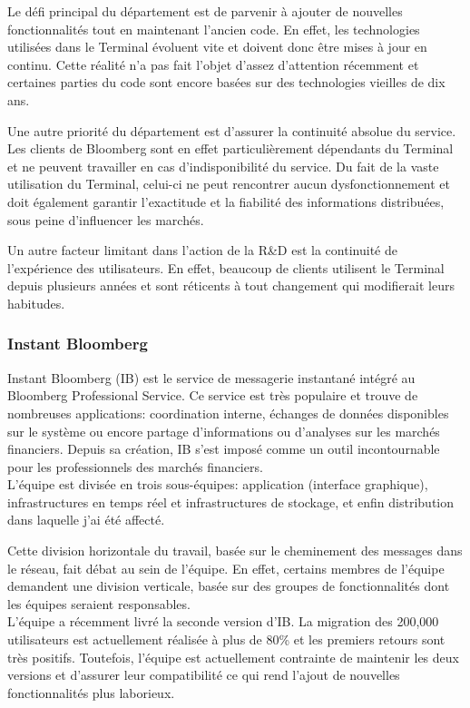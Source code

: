 \documentclass[11pt, oneside, titlepage, a4paper]{article}
\begin{document}
Le défi principal du département est de parvenir à ajouter de nouvelles fonctionnalités tout en maintenant l'ancien code. En effet, les technologies utilisées dans le Terminal évoluent vite et doivent donc être mises à jour en continu. Cette réalité n'a pas fait l'objet d'assez d'attention récemment et certaines parties du code sont encore basées sur des technologies vieilles de dix ans.

Une autre priorité du département est d'assurer la continuité absolue du service. Les clients de Bloomberg sont en effet particulièrement dépendants du Terminal et ne peuvent travailler en cas d'indisponibilité du service. Du fait de la vaste utilisation du Terminal, celui-ci ne peut rencontrer aucun dysfonctionnement et doit également garantir l'exactitude et la fiabilité des informations distribuées, sous peine d'influencer les marchés.

Un autre facteur limitant dans l'action de la R\&D est la continuité de l'expérience des utilisateurs. En effet, beaucoup de clients utilisent le Terminal depuis plusieurs années et sont réticents à tout changement qui modifierait leurs habitudes.
		\subsubsection{Instant Bloomberg}
Instant Bloomberg (IB) est le service de messagerie instantané intégré au Bloomberg Professional Service. Ce service est très populaire et trouve de nombreuses applications: coordination interne, échanges de données disponibles sur le système ou encore partage d'informations ou d'analyses sur les marchés financiers. Depuis sa création, IB s'est imposé comme un outil incontournable pour les professionnels des marchés financiers.
\\

L'équipe est divisée en trois sous-équipes: application (interface graphique), infrastructures en temps réel et infrastructures de stockage, et enfin distribution dans laquelle j'ai été affecté.

Cette division horizontale du travail, basée sur le cheminement des messages dans le réseau, fait débat au sein de l'équipe. En effet, certains membres de l'équipe demandent une division verticale, basée sur des groupes de fonctionnalités dont les équipes seraient responsables.
\\

L'équipe a récemment livré la seconde version d'IB. La migration des 200,000 utilisateurs est actuellement réalisée à plus de 80\% et les premiers retours sont très positifs. Toutefois, l'équipe est actuellement contrainte de maintenir les deux versions et d'assurer leur compatibilité ce qui rend l'ajout de nouvelles fonctionnalités plus laborieux.
\end{document}
